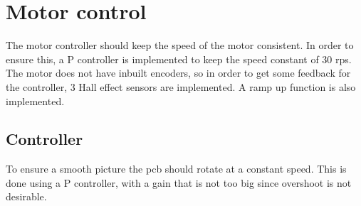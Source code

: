\section{Motor control}
The motor controller should keep the speed of the motor consistent.
In order to ensure this, a P controller is implemented to keep the speed constant of 30 rps.
The motor does not have inbuilt encoders, so in order to get some feedback for the controller, 3 Hall effect sensors are implemented.
A ramp up function is also implemented.

\subsection{Controller}

To ensure a smooth picture the pcb should rotate at a constant speed.
This is done using a P controller, with a gain that is not too big since overshoot is not desirable.


